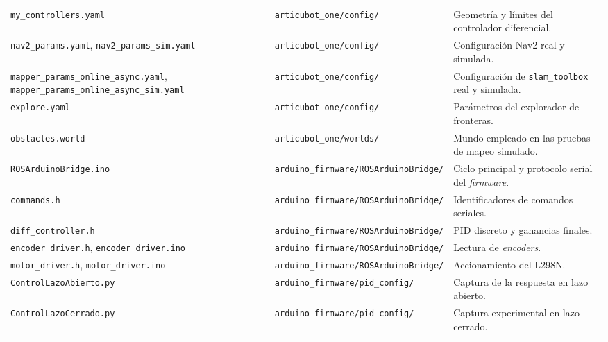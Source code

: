 \begin{appendices}
\begin{longtable}{p{4.5cm} p{4.0cm} p{5.0cm}}
\texttt{my\_\allowbreak{}controllers.\allowbreak{}yaml} & \texttt{articubot\_\allowbreak{}one/\allowbreak{}config/} & Geometría y límites del controlador diferencial. \\
\texttt{nav2\_\allowbreak{}params.\allowbreak{}yaml}, \texttt{nav2\_\allowbreak{}params\_\allowbreak{}sim.\allowbreak{}yaml} & \texttt{articubot\_\allowbreak{}one/\allowbreak{}config/} & Configuración Nav2 real y simulada. \\
\texttt{mapper\_\allowbreak{}params\_\allowbreak{}online\_\allowbreak{}async.\allowbreak{}yaml}, \texttt{mapper\_\allowbreak{}params\_\allowbreak{}online\_\allowbreak{}async\_\allowbreak{}sim.\allowbreak{}yaml} & \texttt{articubot\_\allowbreak{}one/\allowbreak{}config/} & Configuración de \texttt{slam\_toolbox} real y simulada. \\
\texttt{explore.\allowbreak{}yaml} & \texttt{articubot\_\allowbreak{}one/\allowbreak{}config/} & Parámetros del explorador de fronteras. \\
\texttt{obstacles.\allowbreak{}world} & \texttt{articubot\_\allowbreak{}one/\allowbreak{}worlds/} & Mundo empleado en las pruebas de mapeo simulado. \\
\texttt{ROSArduinoBridge.\allowbreak{}ino} & \texttt{arduino\_\allowbreak{}firmware/\allowbreak{}ROSArduinoBridge/} & Ciclo principal y protocolo serial del \textit{firmware}. \\
\texttt{commands.\allowbreak{}h} & \texttt{arduino\_\allowbreak{}firmware/\allowbreak{}ROSArduinoBridge/} & Identificadores de comandos seriales. \\
\texttt{diff\_\allowbreak{}controller.\allowbreak{}h} & \texttt{arduino\_\allowbreak{}firmware/\allowbreak{}ROSArduinoBridge/} & PID discreto y ganancias finales. \\
\texttt{encoder\_\allowbreak{}driver.\allowbreak{}h}, \texttt{encoder\_\allowbreak{}driver.\allowbreak{}ino} & \texttt{arduino\_\allowbreak{}firmware/\allowbreak{}ROSArduinoBridge/} & Lectura de \textit{encoders}. \\
\texttt{motor\_\allowbreak{}driver.\allowbreak{}h}, \texttt{motor\_\allowbreak{}driver.\allowbreak{}ino} & \texttt{arduino\_\allowbreak{}firmware/\allowbreak{}ROSArduinoBridge/} & Accionamiento del L298N. \\
\texttt{ControlLazoAbierto.\allowbreak{}py} & \texttt{arduino\_\allowbreak{}firmware/\allowbreak{}pid\_\allowbreak{}config/} & Captura de la respuesta en lazo abierto. \\
\texttt{ControlLazoCerrado.\allowbreak{}py} & \texttt{arduino\_\allowbreak{}firmware/\allowbreak{}pid\_\allowbreak{}config/} & Captura experimental en lazo cerrado. \\

\end{longtable}
\end{appendices}
